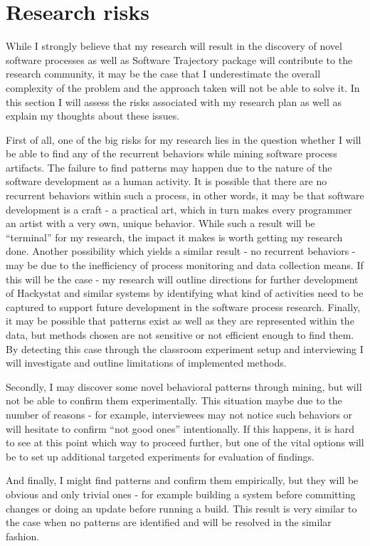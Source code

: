 \documentclass{sig-alternate}
\begin{document}
\section{Research risks}
While I strongly believe that my research will result in the discovery of novel software processes as well as Software Trajectory package will contribute to the research community, it may be the case that I underestimate the overall complexity of the problem and the approach taken will not be able to solve it. In this section I will assess the risks associated with my research plan as well as explain my thoughts about these issues.

First of all, one of the big risks for my research lies in the question whether I will be able to find any of the recurrent behaviors while mining software process artifacts. The failure to find patterns may happen due to the nature of the software development as a human activity. It is possible that there are no recurrent behaviors within such a process, in other words, it may be that software development is a craft - a practical art, which in turn makes every programmer an artist with a very own, unique behavior. While such a result will be ``terminal'' for my research, the impact it makes is worth getting my research done. Another possibility which yields a similar result - no recurrent behaviors - may be due to the inefficiency of process monitoring and data collection means. If this will be the case - my research will outline directions for further development of Hackystat and similar systems by identifying what kind of activities need to be captured to support future development in the software process research. Finally, it may be possible that patterns exist as well as they are represented within the data, but methods chosen are not sensitive or not efficient enough to find them. By detecting this case through the classroom experiment setup and interviewing I will investigate and outline limitations of implemented methods.

Secondly, I may discover some novel behavioral patterns through mining, but will not be able to confirm them experimentally. This situation maybe due to the number of reasons - for example, interviewees may not notice such behaviors or will hesitate to confirm ``not good ones'' intentionally. If this happens, it is hard to see at this point which way to proceed further, but one of the vital options will be to set up additional targeted experiments for evaluation of findings.

And finally, I might find patterns and confirm them empirically, but they will be obvious and only trivial ones - for example building a system before committing changes or doing an update before running a build. This result is very similar to the case when no patterns are identified and will be resolved in the similar fashion.
\end{document}
